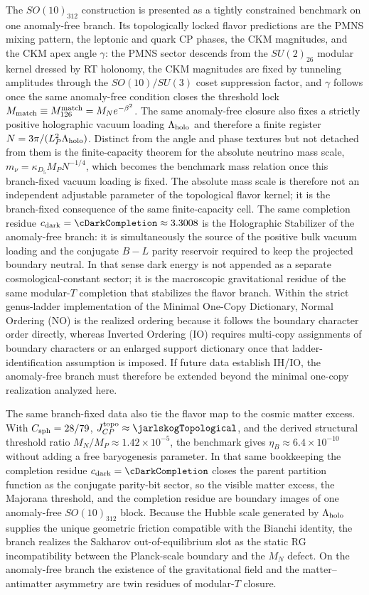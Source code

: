 \documentclass[11pt]{article}
\begin{document}
The $SO(10)_{312}$ construction is presented as a tightly constrained benchmark
on one anomaly-free branch. Its topologically locked flavor predictions are the
PMNS mixing pattern, the leptonic and quark CP phases, the CKM magnitudes, and
the CKM apex angle $\gamma$: the PMNS sector descends from the $SU(2)_{26}$
modular kernel dressed by RT holonomy, the CKM magnitudes are fixed by
tunneling amplitudes through the $SO(10)/SU(3)$ coset suppression factor, and
$\gamma$ follows once the same anomaly-free condition closes the threshold lock
$M_{\rm match}\equiv M_{126}^{\rm match}=M_Ne^{-\beta^2}$. The same
anomaly-free closure also fixes a strictly positive holographic vacuum loading
$\Lambda_{\rm holo}$ and therefore a finite register
$N=3\pi/(L_P^2\Lambda_{\rm holo})$. Distinct from the angle and phase textures
but not detached from them is the finite-capacity theorem for the absolute
neutrino mass scale, $m_\nu=\kappa_{D_5}M_PN^{-1/4}$, which becomes the
benchmark mass relation once this branch-fixed vacuum loading is fixed. The
absolute mass scale is therefore not an independent adjustable parameter of the
topological flavor kernel; it is the branch-fixed consequence of the same
finite-capacity cell. The same completion residue
$c_{\rm dark}=\cDarkCompletion\approx3.3008$ is the Holographic Stabilizer of
the anomaly-free branch: it is simultaneously the source of the positive bulk
vacuum loading and the conjugate $B-L$ parity reservoir required to keep the
projected boundary neutral. In that sense dark energy is not appended as a
separate cosmological-constant sector; it is the macroscopic gravitational
residue of the same modular-$T$ completion that stabilizes the flavor branch.
Within the strict genus-ladder implementation of the Minimal One-Copy
Dictionary, Normal Ordering (NO) is the realized ordering because it follows
the boundary character order directly, whereas Inverted Ordering (IO) requires
multi-copy assignments of boundary characters or an enlarged support
dictionary once that ladder-identification assumption is imposed. If future
data establish IH/IO, the anomaly-free branch must therefore be extended
beyond the minimal one-copy realization analyzed here.

The same branch-fixed data also tie the flavor map to the cosmic matter excess.
With $C_{\rm sph}=28/79$, $J_{CP}^{\rm topo}\approx\jarlskogTopological$, and
the derived structural threshold ratio $M_N/M_P\approx1.42\times10^{-5}$, the
benchmark gives $\eta_B\approx6.4\times10^{-10}$ without adding a free
baryogenesis parameter. In that same bookkeeping the completion residue
$c_{\rm dark}=\cDarkCompletion$ closes the parent partition function as the
conjugate parity-bit sector, so the visible matter excess, the Majorana
threshold, and the completion residue are boundary images of one anomaly-free
$SO(10)_{312}$ block. Because the Hubble scale generated by
$\Lambda_{\rm holo}$ supplies the unique geometric friction compatible with the
Bianchi identity, the branch realizes the Sakharov out-of-equilibrium slot as
the static RG incompatibility between the Planck-scale boundary and the $M_N$
defect. On the anomaly-free branch the existence of the gravitational field and
the matter--antimatter asymmetry are twin residues of modular-$T$ closure.
\end{document}
